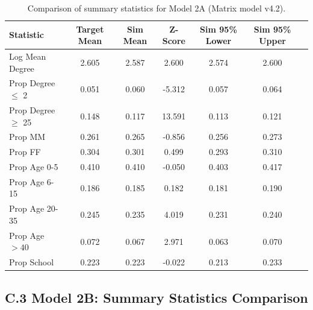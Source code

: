 \begin{table}[htbp]
    \centering
    \caption{Comparison of summary statistics for Model 2A (Matrix model v4.2).}
    \label{tab:stats_m2a}
    \small
    \begin{tabular}{lcccccc}
        \toprule
        Statistic & Target Mean & Sim Mean & Z-Score & Sim 95\% Lower & Sim 95\% Upper \\
        \midrule
        Log Mean Degree      & 2.605 & 2.587 & 2.600 & 2.574 & 2.600 \\
        Prop Degree $\le$ 2  & 0.051 & 0.060 & -5.312 & 0.057 & 0.064 \\
        Prop Degree $\ge$ 25 & 0.148 & 0.117 & 13.591 & 0.113 & 0.121 \\
        Prop MM              & 0.261 & 0.265 & -0.856 & 0.256 & 0.273 \\
        Prop FF              & 0.304 & 0.301 & 0.499 & 0.293 & 0.310 \\
        Prop Age 0-5         & 0.410 & 0.410 & -0.050 & 0.403 & 0.417 \\
        Prop Age 6-15        & 0.186 & 0.185 & 0.182 & 0.181 & 0.190 \\
        Prop Age 20-35       & 0.245 & 0.235 & 4.019 & 0.231 & 0.240 \\
        Prop Age $> 40$      & 0.072 & 0.067 & 2.971 & 0.063 & 0.070 \\
        Prop School          & 0.223 & 0.223 & -0.022 & 0.213 & 0.233 \\
        \bottomrule
    \end{tabular}
\end{table}

\clearpage

\subsection*{C.3 Model 2B: Summary Statistics Comparison}

